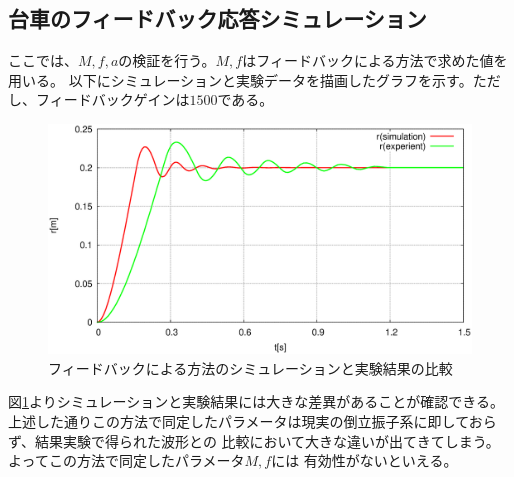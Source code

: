 	\subsection{台車のフィードバック応答シミュレーション}
		ここでは、$M,f,a$の検証を行う。$M,f$はフィードバックによる方法で求めた値を用いる。
		以下にシミュレーションと実験データを描画したグラフを示す。ただし、フィードバックゲインは$1500$である。
		\begin{figure}[H]
			\centering
			\includegraphics[width=0.8\linewidth]{gazo/feedbackExperiment.eps}
			\caption{フィードバックによる方法のシミュレーションと実験結果の比較}
			\label{image:feedback}
		\end{figure}
		図\ref{image:feedback}よりシミュレーションと実験結果には大きな差異があることが確認できる。
		上述した通りこの方法で同定したパラメータは現実の倒立振子系に即しておらず、結果実験で得られた波形との
		比較において大きな違いが出てきてしまう。よってこの方法で同定したパラメータ$M,f$には
		有効性がないといえる。
		

